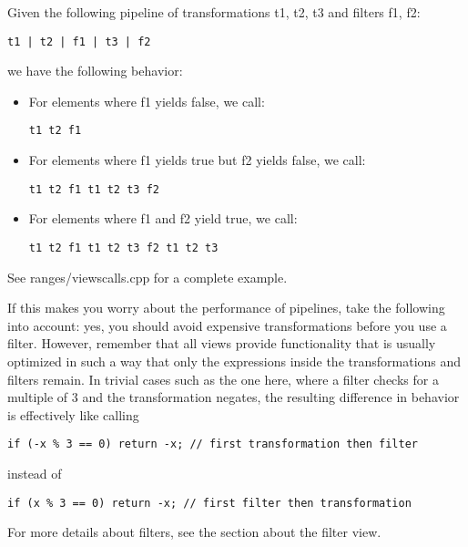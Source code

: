 Given the following pipeline of transformations t1, t2, t3 and filters f1, f2:

\begin{lstlisting}[style=styleCXX]
t1 | t2 | f1 | t3 | f2
\end{lstlisting}

we have the following behavior:

\begin{itemize}
\item
For elements where f1 yields false, we call:

\begin{lstlisting}[style=styleCXX]
t1 t2 f1
\end{lstlisting}

\item
For elements where f1 yields true but f2 yields false, we call:

\begin{lstlisting}[style=styleCXX]
t1 t2 f1 t1 t2 t3 f2
\end{lstlisting}

\item
For elements where f1 and f2 yield true, we call:

\begin{lstlisting}[style=styleCXX]
t1 t2 f1 t1 t2 t3 f2 t1 t2 t3
\end{lstlisting}
\end{itemize}

See ranges/viewscalls.cpp for a complete example.

If this makes you worry about the performance of pipelines, take the following into account: yes, you should avoid expensive transformations before you use a filter. However, remember that all views provide functionality that is usually optimized in such a way that only the expressions inside the transformations and filters remain. In trivial cases such as the one here, where a filter checks for a multiple of 3 and the transformation negates, the resulting difference in behavior is effectively like calling

\begin{lstlisting}[style=styleCXX]
if (-x % 3 == 0) return -x; // first transformation then filter
\end{lstlisting}

instead of

\begin{lstlisting}[style=styleCXX]
if (x % 3 == 0) return -x; // first filter then transformation
\end{lstlisting}

For more details about filters, see the section about the filter view.
